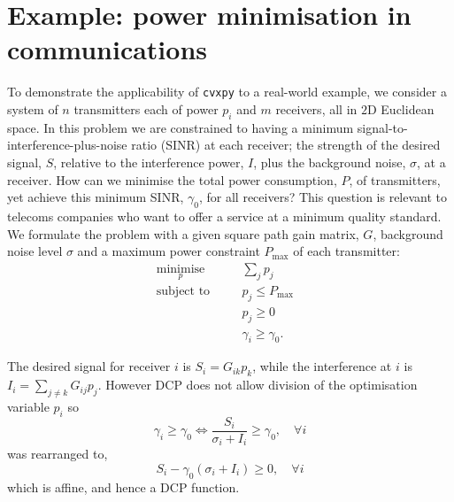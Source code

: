 \documentclass[twocolumn,secnumarabic,amssymb, nobibnotes, aps, prl,superscriptaddress]{revtex4-1}
\begin{document}
\section{Example: power minimisation in communications}
\noindent To demonstrate the applicability of \texttt{cvxpy} to  a real-world example, we consider a system of $n$ transmitters each of power $p_i$ and $m$ receivers, all in $2$D Euclidean space\cite{shannon1949}. In this problem we are constrained to having a minimum signal-to-interference-plus-noise ratio (SINR) at each receiver; the strength of the desired signal, $S$, relative to the interference power, $I$, plus the background noise, $\sigma$, at a receiver. How can we minimise the total power consumption, $P$, of transmitters, yet achieve this minimum SINR, $\gamma_0$, for all receivers? This question is relevant to telecoms companies who want to offer a service at a minimum quality standard. We formulate the problem with a given square path gain matrix, $G$, background noise level $\sigma$ and a maximum power constraint $P_{\text{max}}$ of each transmitter:
\begin{align*}
&\underset{p}{\text{minimise}} \quad &&\sum_j p_j\\
&\text{subject to} \quad &&p_j \leq P_{\max}\\
& \quad &&p_j \geq 0\\
& \quad &&\gamma_i \geq \gamma_0.&&
\end{align*}

The desired signal for receiver $i$ is $S_i = G_{ik}p_k$, while the interference at $i$ is $I_i = \sum_{j\neq k}G_{ij}p_j$. However DCP does not allow division of the optimisation variable $p_i$ so  
\begin{equation*}
  \gamma_i \geq \gamma_0\Longleftrightarrow  \frac{S_i}{\sigma_i + I_i}\geq \gamma_0, \quad \forall i
\end{equation*}
was rearranged to,
\begin{equation*}
S_i-\gamma_0(\sigma_i + I_i)\geq 0, \quad \forall i
\end{equation*} which is affine, and hence a DCP function.
\end{document}
